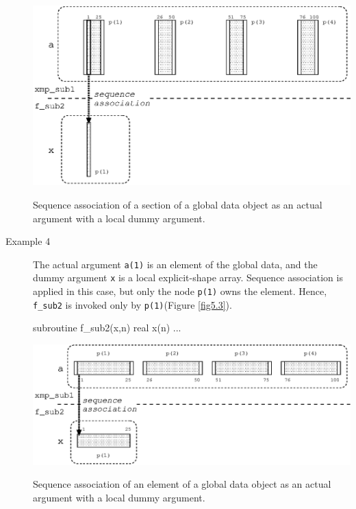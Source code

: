 \begin{description}
\begin{myfigure}
 \includegraphics[scale=0.7]{figs/fig5.25.eps}
 \caption{Sequence association of a section of a global data object as
  an actual argument with a local dummy argument.}
 \label{fig5.25}
\end{myfigure}

\item[Example 4]

	   The actual argument {\tt a(1)} is an element of the global
	   data, and the dummy argument {\tt x} is a local
	   explicit-shape array. Sequence association is applied 
	   in this case, but only the node {\tt p(1)} owns the element.
	   Hence, {\tt f\_sub2} is invoked only by {\tt p(1)}(Figure
	   \ref{fig5.3}).

%
\begin{Fexample}
      subroutine f_sub2(x,n)
      real x(n)
      ...
\end{Fexample}

\begin{myfigure}
 \includegraphics[scale=0.7]{figs/fig5.3.eps}
 \caption{Sequence association of an element of a global data object as
  an actual argument with a local dummy argument.}
 \label{fig5.3}
\end{myfigure}


\end{description}

